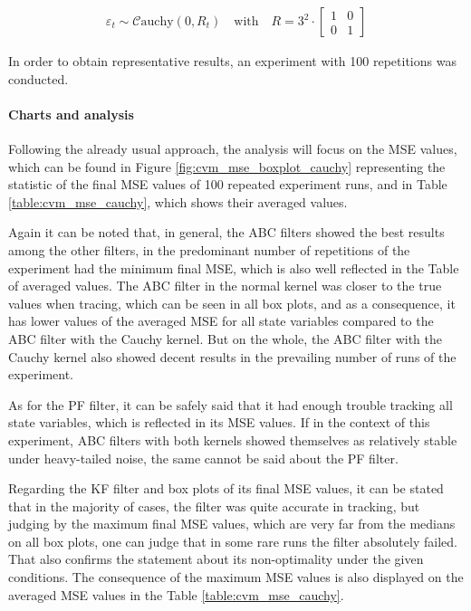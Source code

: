 \begin{equation}
\begin{aligned}
\varepsilon_t \sim \mathcal{C}\text{auchy}\left(0, R_t\right) \quad \text{with} \quad R =
    3^{2}\cdot
    \begin{bmatrix}
        1 & 0 \\
        0 & 1
    \end{bmatrix}
\end{aligned}
\end{equation}

In order to obtain representative results, an experiment with 100 repetitions was conducted. 

\paragraph*{Charts and analysis}
Following the already usual approach, the analysis will focus on the MSE values, which can be found in Figure \ref{fig:cvm_mse_boxplot_cauchy} representing the statistic of the final MSE values of 100 repeated experiment runs, and in Table \ref{table:cvm_mse_cauchy}, which shows their averaged values.

Again it can be noted that, in general, the ABC filters showed the best results among the other filters, in the predominant number of repetitions of the experiment had the minimum final MSE, which is also well reflected in the Table of averaged values. The ABC filter in the normal kernel was closer to the true values when tracing, which can be seen in all box plots, and as a consequence, it has lower values of the averaged MSE for all state variables compared to the ABC filter with the Cauchy kernel. But on the whole, the ABC filter with the Cauchy kernel also showed decent results in the prevailing number of runs of the experiment.

As for the PF filter, it can be safely said that it had enough trouble tracking all state variables, which is reflected in its MSE values. If in the context of this experiment, ABC filters with both kernels showed themselves as relatively stable under heavy-tailed noise, the same cannot be said about the PF filter.

Regarding the KF filter and box plots of its final MSE values, it can be stated that in the majority of cases, the filter was quite accurate in tracking, but judging by the maximum final MSE values, which are very far from the medians on all box plots, one can judge that in some rare runs the filter absolutely failed. That also confirms the statement about its non-optimality under the given conditions. The consequence of the maximum MSE values is also displayed on the averaged MSE values in the Table \ref{table:cvm_mse_cauchy}.

